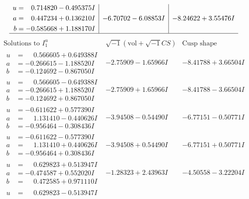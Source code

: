 \documentclass[1p]{elsarticle_modified}
\theoremstyle{definition}
\newcommand{\I}{\sqrt{-1}}
\begin{document}
$$\begin{array}{c|c|c}
\begin{aligned}
u &= \phantom{-}0.714820 - 0.495375 I \\
a &= \phantom{-}0.447234 + 0.136210 I \\
b &= -0.585668 + 1.188170 I\end{aligned}
 & -6.70702 - 6.08853 I & -8.24622 + 3.55476 I\\
 \hline 
 \end{array}$$\newpage$$\begin{array}{c|c|c}  
\text{Solutions to }I^u_{1}& \I (\text{vol} + \sqrt{-1}CS) & \text{Cusp shape}\\
 \hline 
\begin{aligned}
u &= \phantom{-}0.566605 + 0.649388 I \\
a &= -0.266615 - 1.188520 I \\
b &= -0.124692 - 0.867050 I\end{aligned}
 & -2.75909 - 1.65966 I & -8.41788 + 3.66504 I \\ \hline\begin{aligned}
u &= \phantom{-}0.566605 - 0.649388 I \\
a &= -0.266615 + 1.188520 I \\
b &= -0.124692 + 0.867050 I\end{aligned}
 & -2.75909 + 1.65966 I & -8.41788 - 3.66504 I \\ \hline\begin{aligned}
u &= -0.611622 + 0.577390 I \\
a &= \phantom{-}1.131410 - 0.440626 I \\
b &= -0.956464 - 0.308436 I\end{aligned}
 & -3.94508 - 0.54490 I & -6.77151 - 0.50771 I \\ \hline\begin{aligned}
u &= -0.611622 - 0.577390 I \\
a &= \phantom{-}1.131410 + 0.440626 I \\
b &= -0.956464 + 0.308436 I\end{aligned}
 & -3.94508 + 0.54490 I & -6.77151 + 0.50771 I \\ \hline\begin{aligned}
u &= \phantom{-}0.629823 + 0.513947 I \\
a &= -0.474587 + 0.552020 I \\
b &= \phantom{-}0.472585 + 0.971110 I\end{aligned}
 & -1.28323 + 2.43963 I & -4.50558 - 3.22204 I \\ \hline\begin{aligned}
u &= \phantom{-}0.629823 - 0.513947 I \\

\end{aligned}
\end{array}$$
\end{document}
